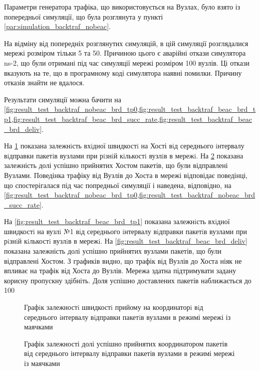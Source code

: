 \documentclass[a4paper,ukrainian,utf8,nocolumnsxix,floatsection,equationsection]{eskdtext}
\begin{document}
Параметри генератора трафіка, що використовується на Вузлах, було взято із попередньої симуляції, що була розглянута у пункті \ref{par:simulation_backtraf_nobeac}.

На відміну від попередніх розглянутих симуляцій, в цій симуляції розглядалися мережі розміром тільки 5 та 50. Причиною цього є аварійні откази симулятора ns-2, що були отримані під час симуляції мережі розміром 100 вузлів. Ці откази вказують на те, що в програмному коді симулятора наявні помилки. Причину отказів знайти не вдалося.

Результати симуляції можна бачити на \cref{fig:result_test_backtraf_nobeac_brd_tp0,fig:result_test_backtraf_beac_brd_tp1,fig:result_test_backtraf_beac_brd_succ_rate,fig:result_test_backtraf_beac_brd_deliv}.

На \cref{fig:result_test_backtraf_beac_brd_tp0} показана залежнiсть вхiдної швидкостi на Хості вiд середнього iнтервалу вiдправки пакетiв вузлами при рiзнiй кiлькостi вузлiв в мережi. На \cref{fig:result_test_backtraf_beac_brd_succ_rate} показана залежність долі успішно прийнятих Хостом пакетів, що були відправлені Вузлами. Поведінка трафіку від Вузлів до Хоста в мережі відповідає поведінці, що спостерігалася під час попредньої симуляції і наведена, відповідно, на \cref{fig:result_test_backtraf_nobeac_brd_tp0,fig:result_test_backtraf_nobeac_brd_succ_rate}. 

На \cref{fig:result_test_backtraf_beac_brd_tp1} показана залежнiсть вхiдної швидкостi на вузлi №1 вiд середнього iнтервалу вiдправки пакетiв вузлами при рiзнiй кiлькостi вузлiв в мережi. На \cref{fig:result_test_backtraf_beac_brd_deliv} показана залежність долі успішно прийнятих вузлами пакетів, що були відправлені Хостом. З графиків видно, що трафік від Вузлів до Хоста ніяк не впливає на трафік від Хоста до Вузлів. Мережа здатна підтримувати задану корисну пропускну здібніть. Доля успішно доставлених пакетів наближається до 100%

\begin{figure}[h]
	\centering
	\caption{\label{fig:result_test_backtraf_beac_brd_tp0}Графiк залежностi швидкостi прийому на координаторi вiд середнього iнтервалу вiдправки пакетiв вузлами в режимі мережі із маячками}
\end{figure}

\begin{figure}[h]
	\centering
	\caption{\label{fig:result_test_backtraf_beac_brd_succ_rate}Графік залежності долі успішно прийнятих координатором пакетів від середнього інтервалу відправки пакетів вузлами в режимі мережі із маячками}
\end{figure}
\end{document}
